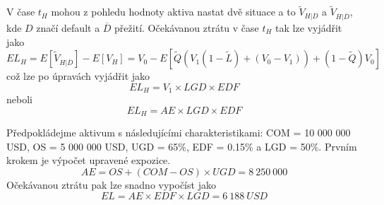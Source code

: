 V čase $t_H$ mohou z pohledu hodnoty aktiva nastat dvě situace a to $\tilde{V}_{H|D}$ a $\tilde{V}_{H|\overline{D}}$, kde $D$ značí default a $\overline{D}$ přežití. Očekávanou ztrátu v čase $t_H$ tak lze vyjádřit jako
\begin{equation}
EL_H = E[\tilde{V}_{H|\overline{D}}] - E[V_H] = V_0 - E[\tilde{Q}(V_1(1-\tilde{L}) + (V_0 - V_1)) + (1 - \tilde{Q})V_0]
\end{equation}
což lze po úpravách vyjádřit jako
\begin{equation}
EL_H = V_1 \times LGD \times EDF
\end{equation}
neboli
\begin{equation}
EL_H = AE \times LGD \times EDF
\end{equation}

\begin{example}
Předpokládejme aktivum s následujícími charakteristikami: COM = 10 000 000 USD, OS = 5 000 000 USD, UGD = 65\%, EDF = 0.15\% a LGD = 50\%. Prvním krokem je výpočet upravené expozice.
\begin{equation}
AE = OS + (COM - OS) \times UGD = 8~250~000
\end{equation}
Očekávanou ztrátu pak lze snadno vypočíst jako
\begin{equation}
EL = AE \times EDF \times LGD = 6~188~USD
\end{equation}
\end{example}

